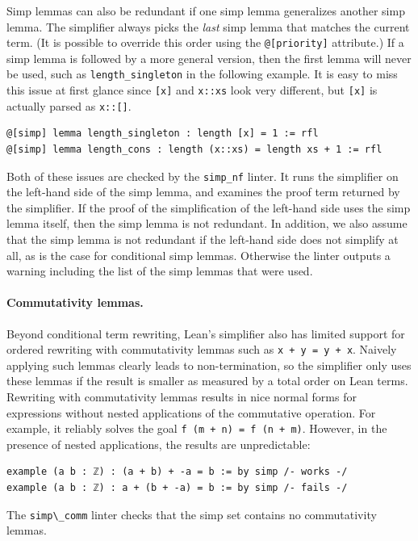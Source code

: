 \documentclass[runningheads]{llncs}
\newcommand{\lean}[1]{\lstinline[language=lean]{#1}}
\begin{document}
Simp lemmas can also be redundant if one simp lemma generalizes another simp lemma.
The simplifier always picks the \emph{last} simp lemma
that matches the current term.
(It is possible to override this order
using the \lean{@[priority]} attribute.)
If a simp lemma is followed by a more general version,
then the first lemma will never be used,
such as \lean{length_singleton} in the following example.
It is easy to miss this issue at first glance
since \lean{[x]} and \lean{x::xs} look very different,
but \lean{[x]} is actually parsed as \lean{x::[]}.
\begin{lstlisting}
@[simp] lemma length_singleton : length [x] = 1 := rfl
@[simp] lemma length_cons : length (x::xs) = length xs + 1 := rfl
\end{lstlisting}

Both of these issues are checked by the \lean{simp_nf} linter.
It runs the simplifier on
the left-hand side of the simp lemma,
and examines the proof term returned by the simplifier.
If the proof of the simplification of the left-hand side uses
the simp lemma itself,
then the simp lemma is not redundant.
In addition, we also assume that the simp lemma is not redundant
if the left-hand side does not simplify at all,
as is the case for conditional simp lemmas.
Otherwise the linter outputs a warning
including the list of the simp lemmas
that were used.

\paragraph{Commutativity lemmas.}
Beyond conditional term rewriting,
Lean's simplifier also has limited support for
ordered rewriting with commutativity lemmas
such as \lean{x + y = y + x}.
Naively applying such lemmas clearly leads to non-termination,
so the simplifier only uses these lemmas
if the result is smaller as measured by a total order on Lean terms.
Rewriting with commutativity lemmas results in nice normal forms
for expressions without nested applications of the commutative operation.
For example, it reliably solves the goal \lean{f (m + n) = f (n + m)}.
However, in the presence of nested applications,
the results are unpredictable:
\begin{lstlisting}
example (a b : ℤ) : (a + b) + -a = b := by simp /- works -/
example (a b : ℤ) : a + (b + -a) = b := by simp /- fails -/
\end{lstlisting}
The \lean{simp\_comm} linter checks that
the simp set contains no commutativity lemmas.
\end{document}
